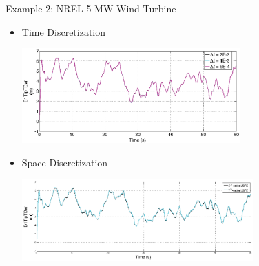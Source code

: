 \documentclass[xcolor=cmyk]{beamer}
\begin{document}
\begin{frame}{Example 2: NREL 5-MW Wind Turbine}
    \begin{itemize}
        \item
        Time Discretization
         \begin{center}
         \includegraphics[width=3.3in]{EPSF/5MW_Coupled_dt.eps}
         \end{center}
         \item
         Space Discretization
         \begin{center}
         \includegraphics[width=3.5in]{EPSF/5MW_Coupled_Mesh.eps}
         \end{center}
    \end{itemize}
\end{frame}
\end{document}
